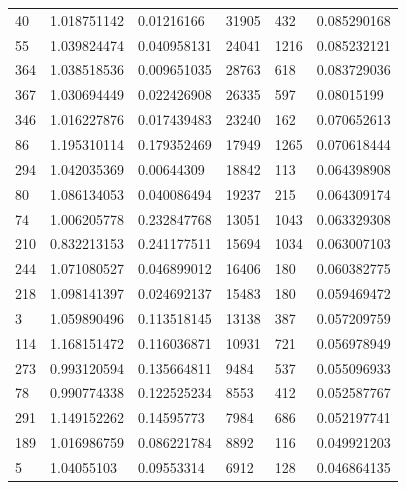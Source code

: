 \documentclass{cumcmthesis}
\begin{document}
\begin{description}
\begin{longtable}{l|llll|l}
            40   & 1.018751142  & 0.01216166   & 31905    & 432            & 0.085290168    \\
            55   & 1.039824474  & 0.040958131  & 24041    & 1216           & 0.085232121    \\
            364  & 1.038518536  & 0.009651035  & 28763    & 618            & 0.083729036    \\
            367  & 1.030694449  & 0.022426908  & 26335    & 597            & 0.08015199     \\
            346  & 1.016227876  & 0.017439483  & 23240    & 162            & 0.070652613    \\
            86   & 1.195310114  & 0.179352469  & 17949    & 1265           & 0.070618444    \\
            294  & 1.042035369  & 0.00644309   & 18842    & 113            & 0.064398908    \\
            80   & 1.086134053  & 0.040086494  & 19237    & 215            & 0.064309174    \\
            74   & 1.006205778  & 0.232847768  & 13051    & 1043           & 0.063329308    \\
            210  & 0.832213153  & 0.241177511  & 15694    & 1034           & 0.063007103    \\
            244  & 1.071080527  & 0.046899012  & 16406    & 180            & 0.060382775    \\
            218  & 1.098141397  & 0.024692137  & 15483    & 180            & 0.059469472    \\
            3    & 1.059890496  & 0.113518145  & 13138    & 387            & 0.057209759    \\
            114  & 1.168151472  & 0.116036871  & 10931    & 721            & 0.056978949    \\
            273  & 0.993120594  & 0.135664811  & 9484     & 537            & 0.055096933    \\
            78   & 0.990774338  & 0.122525234  & 8553     & 412            & 0.052587767    \\
            291  & 1.149152262  & 0.14595773   & 7984     & 686            & 0.052197741    \\
            189  & 1.016986759  & 0.086221784  & 8892     & 116            & 0.049921203    \\
            5    & 1.04055103   & 0.09553314   & 6912     & 128            & 0.046864135    \\
            \bottomrule
        \end{longtable}
\end{description}
\end{document}
